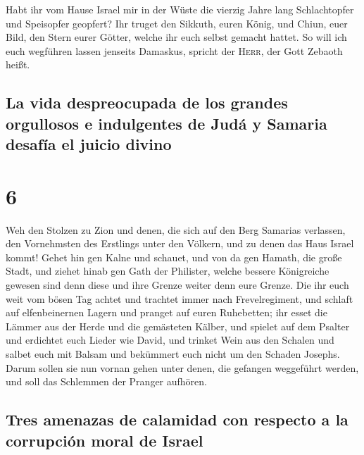  Habt ihr vom Hause Israel mir in der Wüste die vierzig
Jahre lang Schlachtopfer und Speisopfer geopfert?  Ihr
truget den Sikkuth, euren König, und Chiun, euer Bild, den Stern eurer
Götter, welche ihr euch selbst gemacht hattet.  So will
ich euch wegführen lassen jenseits Damaskus, spricht der \textsc{Herr},
der Gott Zebaoth heißt.

\hypertarget{la-vida-despreocupada-de-los-grandes-orgullosos-e-indulgentes-de-juduxe1-y-samaria-desafuxeda-el-juicio-divino}{%
\subsection{La vida despreocupada de los grandes orgullosos e
indulgentes de Judá y Samaria desafía el juicio
divino}\label{la-vida-despreocupada-de-los-grandes-orgullosos-e-indulgentes-de-juduxe1-y-samaria-desafuxeda-el-juicio-divino}}

\hypertarget{section-5}{%
\section{6}\label{section-5}}

 Weh den Stolzen zu Zion und denen, die sich auf den Berg
Samarias verlassen, den Vornehmsten des Erstlings unter den Völkern, und
zu denen das Haus Israel kommt!  Gehet hin gen Kalne und
schauet, und von da gen Hamath, die große Stadt, und ziehet hinab gen
Gath der Philister, welche bessere Königreiche gewesen sind denn diese
und ihre Grenze weiter denn eure Grenze.  Die ihr euch
weit vom bösen Tag achtet und trachtet immer nach Frevelregiment,
 und schlaft auf elfenbeinernen Lagern und pranget auf
euren Ruhebetten; ihr esset die Lämmer aus der Herde und die gemästeten
Kälber,  und spielet auf dem Psalter und erdichtet euch
Lieder wie David,  und trinket Wein aus den Schalen und
salbet euch mit Balsam und bekümmert euch nicht um den Schaden Josephs.
 Darum sollen sie nun vornan gehen unter denen, die
gefangen weggeführt werden, und soll das Schlemmen der Pranger aufhören.

\hypertarget{tres-amenazas-de-calamidad-con-respecto-a-la-corrupciuxf3n-moral-de-israel}{%
\subsection{Tres amenazas de calamidad con respecto a la corrupción
moral de
Israel}\label{tres-amenazas-de-calamidad-con-respecto-a-la-corrupciuxf3n-moral-de-israel}}

